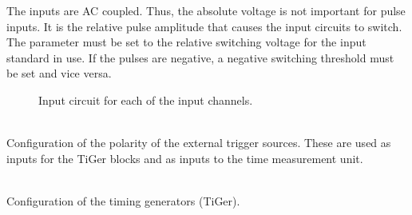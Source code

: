 		\noindent The inputs are AC coupled. Thus, the absolute voltage is not important for pulse inputs.
		It is the relative pulse amplitude that causes the input circuits to switch.
		The parameter must be set to the relative switching voltage for the input standard in use.
		If the pulses are negative, a negative switching threshold must be set and vice versa.
	\begin{figure}
		\begin{center}
			\caption{Input circuit for each of the input channels. \label{fig:dcoffset1}}
		\end{center}
	\end{figure}

	\\
	Configuration of the polarity of the external trigger sources.
	These are used as inputs for the TiGer blocks and as inputs to the time measurement unit.\par

	\\
	Configuration of the timing generators (TiGer).

